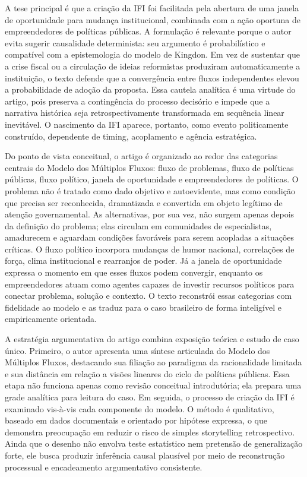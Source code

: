 \documentclass[12pt,a4paper]{article}
\begin{document}
A tese principal é que a criação da IFI foi facilitada pela abertura de uma janela de oportunidade para mudança institucional, combinada com a ação oportuna de empreendedores de políticas públicas. A formulação é relevante porque o autor evita sugerir causalidade determinista: seu argumento é probabilístico e compatível com a epistemologia do modelo de Kingdon. Em vez de sustentar que a crise fiscal ou a circulação de ideias reformistas produziram automaticamente a instituição, o texto defende que a convergência entre fluxos independentes elevou a probabilidade de adoção da proposta. Essa cautela analítica é uma virtude do artigo, pois preserva a contingência do processo decisório e impede que a narrativa histórica seja retrospectivamente transformada em sequência linear inevitável. O nascimento da IFI aparece, portanto, como evento politicamente construído, dependente de timing, acoplamento e agência estratégica.\parencite{anonsd_sem_titulo,brasil2022_abordagens_contemporaneas}

Do ponto de vista conceitual, o artigo é organizado ao redor das categorias centrais do Modelo dos Múltiplos Fluxos: fluxo de problemas, fluxo de políticas públicas, fluxo político, janela de oportunidade e empreendedores de políticas. O problema não é tratado como dado objetivo e autoevidente, mas como condição que precisa ser reconhecida, dramatizada e convertida em objeto legítimo de atenção governamental. As alternativas, por sua vez, não surgem apenas depois da definição do problema; elas circulam em comunidades de especialistas, amadurecem e aguardam condições favoráveis para serem acopladas a situações críticas. O fluxo político incorpora mudanças de humor nacional, correlações de força, clima institucional e rearranjos de poder. Já a janela de oportunidade expressa o momento em que esses fluxos podem convergir, enquanto os empreendedores atuam como agentes capazes de investir recursos políticos para conectar problema, solução e contexto. O texto reconstrói essas categorias com fidelidade ao modelo e as traduz para o caso brasileiro de forma inteligível e empiricamente orientada.\parencite{anonsd_sem_titulo,brasil2022_abordagens_contemporaneas}

A estratégia argumentativa do artigo combina exposição teórica e estudo de caso único. Primeiro, o autor apresenta uma síntese articulada do Modelo dos Múltiplos Fluxos, destacando sua filiação ao paradigma da racionalidade limitada e sua distância em relação a visões lineares do ciclo de políticas públicas. Essa etapa não funciona apenas como revisão conceitual introdutória; ela prepara uma grade analítica para leitura do caso. Em seguida, o processo de criação da IFI é examinado vis-à-vis cada componente do modelo. O método é qualitativo, baseado em dados documentais e orientado por hipótese expressa, o que demonstra preocupação em reduzir o risco de simples storytelling retrospectivo. Ainda que o desenho não envolva teste estatístico nem pretensão de generalização forte, ele busca produzir inferência causal plausível por meio de reconstrução processual e encadeamento argumentativo consistente.\parencite{anonsd_sem_titulo}
\end{document}
